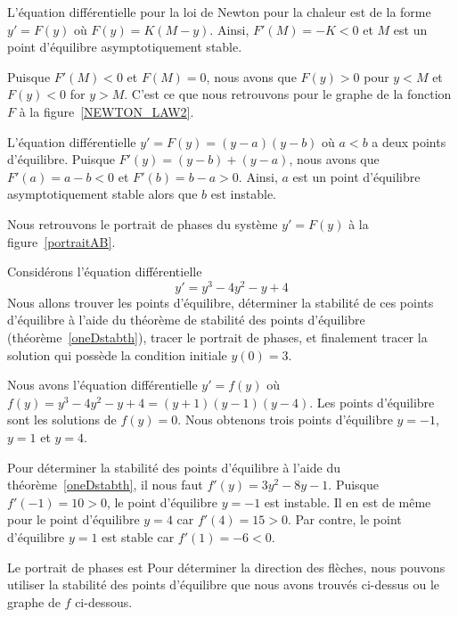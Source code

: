 {\begin{egg}
L'équation différentielle pour la loi de Newton pour la chaleur est de
la forme $y'= F(y)$ où $F(y) = K(M-y)$.  Ainsi, $F'(M) = -K <0$ et $M$
est un point d'équilibre asymptotiquement stable.

Puisque $F'(M)<0$ et $F(M)=0$, nous avons que $F(y)>0$ pour $y<M$ et
$F(y)<0$ for $y>M$.  C'est ce que nous retrouvons pour le graphe de la
fonction $F$ à la figure~\ref{NEWTON_LAW2}.
\end{egg}

\begin{egg}
L'équation différentielle $y'= F(y) = (y-a)(y-b)$ où $a < b$ a
deux points d'équilibre.  Puisque $F'(y) = (y-b) + (y-a)$, nous avons que
$F'(a) = a-b <0$ et $F'(b) = b-a>0$.  Ainsi, $a$ est un point
d'équilibre asymptotiquement stable alors que $b$ est instable.

Nous retrouvons le portrait de phases du système $y'=F(y)$ à la
figure~\ref{portraitAB}.
\end{egg}


\begin{egg}
Considérons l'équation différentielle
\[
y'= y^3 - 4y^2 - y + 4
\]
Nous allons trouver les points d'équilibre, déterminer la stabilité de ces
points d'équilibre à l'aide du théorème de stabilité des points
d'équilibre (théorème~\ref{oneDstabth}), tracer le portrait de phases,
et finalement tracer la solution qui possède la condition initiale
$y(0)=3$.

Nous avons l'équation différentielle $y'= f(y)$ où
$f(y) = y^3 - 4y^2 - y + 4 = (y+1)(y-1)(y-4)$.  Les points d'équilibre
sont les solutions de $f(y)=0$.  Nous obtenons trois points d'équilibre
$y=-1$, $y=1$ et $y=4$.

Pour déterminer la stabilité des points d'équilibre à l'aide du
théorème~\ref{oneDstabth}, il nous faut $f'(y) = 3y^2 -8 y -1$.
Puisque $f'(-1) = 10>0$, le point d'équilibre $y=-1$ est instable.  Il
en est de même pour le point d'équilibre $y=4$ car $f'(4) = 15>0$.
Par contre, le point d'équilibre $y=1$ est stable car $f'(1) = -6 <0$. 

Le portrait de phases est
Pour déterminer la direction des flèches, nous pouvons utiliser la
stabilité des points d'équilibre que nous avons trouvés ci-dessus ou le
graphe de $f$ ci-dessous.


\end{egg}}
